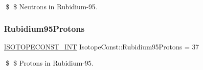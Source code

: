 \$ \$ Neutrons in Rubidium-\/95. \mbox{\label{group___isotope_const-_rubidium-_rb95_gac7184b9aa107449f23c75b0db38c2978}} 
\subsubsection{\texorpdfstring{Rubidium95\+Protons}{Rubidium95Protons}}
{\footnotesize\ttfamily \mbox{\hyperlink{group___isotope_const-_macros_ga5f18360b3e99483a35c32d789e62621c}{I\+S\+O\+T\+O\+P\+E\+C\+O\+N\+S\+T\+\_\+\+I\+NT}} Isotope\+Const\+::\+Rubidium95\+Protons = 37}

\$ \$ Protons in Rubidium-\/95. 